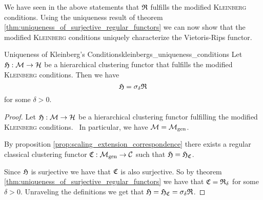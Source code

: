 We have seen in the above statements that $\mathfrak{R}$ fulfills the modified \textsc{Kleinberg} conditions.
Using the uniqueness result of theorem \ref{thm:uniqueness_of_surjective_regular_functors} we can now show that the modified \textsc{Kleinberg} conditions uniquely characterize the Vietoris-Rips functor.

\begin{theorem}{Uniqueness of Kleinberg's Conditions}{kleinbergs_uniqueness_conditions}
    Let $\mathfrak{H}: \mathcal{M} \to \mathcal{H}$ be a hierarchical clustering functor that fulfills the modified \textsc{Kleinberg} conditions. Then we have
    $$
    \mathfrak{H} = \sigma_\delta \mathfrak{R}
    $$
    for some $\delta > 0$.
\end{theorem}

\begin{proof}
Let $\mathfrak{H}: \mathcal{M} \to \mathcal{H}$ be a hierarchical clustering functor fulfilling the modified \textsc{Kleinberg} conditions. \Ie\ In particular, we have $\mathcal{M} = {\mathcal{M}_\mathrm{gen}}$.

By proposition \ref{prop:scaling_extension_correspondence} there exists a regular classical clustering functor $\mathfrak{C}: {\mathcal{M}_\mathrm{gen}} \to \mathcal{C}$ such that $\mathfrak{H} = \mathfrak{H}_{\mathfrak{C}}$.

Since $\mathfrak{H}$ is surjective we have that $\mathfrak{C}$ is also surjective. So by theorem \ref{thm:uniqueness_of_surjective_regular_functors} we have that $\mathfrak{C} = \mathfrak{R}_\delta$ for some $\delta > 0$. Unraveling the definitions we get that $\mathfrak{H} = \mathfrak{H}_{\mathfrak{C}} = \sigma_\delta \mathfrak{R}$.
\end{proof}
